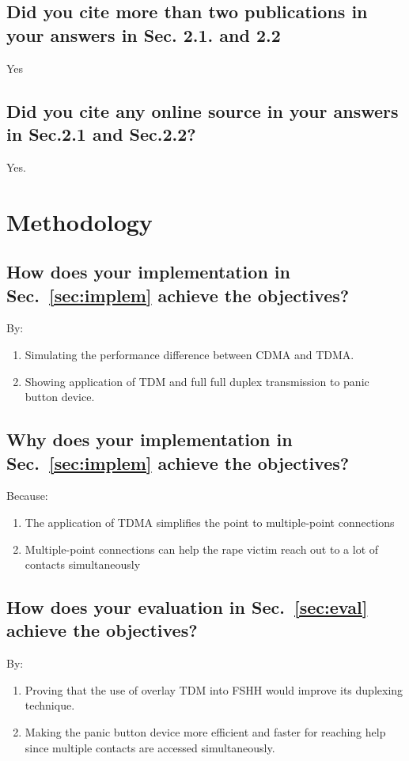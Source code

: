 \subsection{Did you cite more than two publications in your answers in Sec. 2.1. and 2.2}
Yes
	
\subsection{Did you cite any online source in your answers in Sec.2.1 and Sec.2.2?}
Yes.


\section{Methodology}

\subsection{How does your implementation in Sec.~\ref{sec:implem} achieve the objectives?}
By:
\begin{enumerate}
	\item Simulating the performance difference between CDMA and TDMA.
	\item Showing application of TDM and full full duplex transmission to panic button device.
\end{enumerate}

\subsection{Why does your implementation in Sec.~\ref{sec:implem} achieve the objectives?}
Because:
\begin{enumerate}
	\item The application of TDMA simplifies the point to multiple-point connections
	
	\item Multiple-point connections can help the rape victim reach out to a lot of contacts simultaneously
	
\end{enumerate}

\subsection{How does your evaluation in Sec.~\ref{sec:eval} achieve the objectives?}
By:
\begin{enumerate}
	\item Proving that the use of overlay TDM into FSHH would improve its duplexing technique.
	\item Making the panic button device more efficient and faster for reaching help since multiple contacts are accessed simultaneously.
\end{enumerate}

